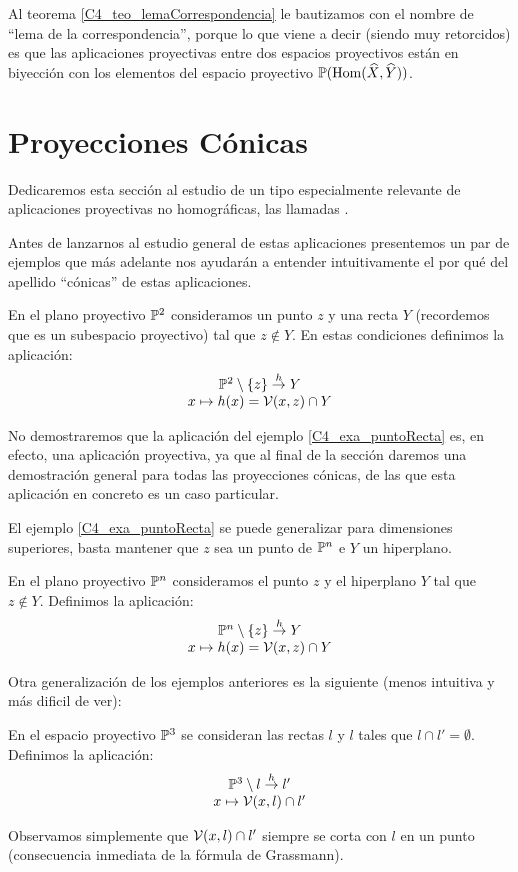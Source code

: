 Al teorema \ref{C4_teo_lemaCorrespondencia} le bautizamos con el nombre de ``lema de la correspondencia'', porque lo que viene a decir (siendo muy retorcidos) es que las aplicaciones proyectivas entre dos espacios proyectivos están en biyección con los elementos del espacio proyectivo $\mathbb{P}(\mathrm{Hom}(\widehat{X},\widehat{Y}))$.

\section{Proyecciones Cónicas}
Dedicaremos esta sección al estudio de un tipo especialmente relevante de aplicaciones proyectivas no homográficas, las llamadas .

Antes de lanzarnos al estudio general de estas aplicaciones presentemos un par de ejemplos que más adelante nos ayudarán a entender intuitivamente el por qué del apellido ``cónicas'' de estas aplicaciones.

\begin{exa}
	\label{C4_exa_puntoRecta}
	En el plano proyectivo $\mathbb{P}^2$ consideramos un punto $z$ y una recta $Y$ (recordemos que es un subespacio proyectivo) tal que $z\not\in Y$. En estas condiciones definimos la aplicación:
	\[\begin{array}{c}
		\mathbb{P}^2\setminus\{z\}\stackrel{h}{\to} Y\\
		x\mapsto h(x)=\mathcal{V}(x,z)\cap Y
	\end{array}\]
\end{exa}

No demostraremos que la aplicación del ejemplo \ref{C4_exa_puntoRecta} es, en efecto, una aplicación proyectiva, ya que al final de la sección daremos una demostración general para todas las proyecciones cónicas, de las que esta aplicación en concreto es un caso particular.

El ejemplo \ref{C4_exa_puntoRecta} se puede generalizar para dimensiones superiores, basta mantener que $z$ sea un punto de $\mathbb{P}^n$ e $Y$ un hiperplano.
\begin{exa}
	\label{C4_exa_puntoHiperplano}
	En el plano proyectivo $\mathbb{P}^n$ consideramos el punto $z$ y el hiperplano $Y$ tal que $z\not\in Y$. Definimos la aplicación:
	\[\begin{array}{c}
	\mathbb{P}^n\setminus\{z\}\stackrel{h}{\to} Y\\
	x\mapsto h(x)=\mathcal{V}(x,z)\cap Y
	\end{array}\]
\end{exa}
Otra generalización de los ejemplos anteriores es la siguiente (menos intuitiva y más dificil de ver):
\begin{exa}
	En el espacio proyectivo $\mathbb{P}^3$ se consideran las rectas $l$ y $l$ tales que $l\cap l'=\emptyset$. Definimos la aplicación:
	\[\begin{array}{c}
	\mathbb{P}^3\setminus l\stackrel{h}{\to}l'\\
	x\mapsto\mathcal{V}(x,l)\cap l'
	\end{array}\]
\end{exa}
Observamos simplemente que $\mathcal{V}(x,l)\cap l'$ siempre se corta con $l$ en un punto (consecuencia inmediata de la fórmula de Grassmann).

